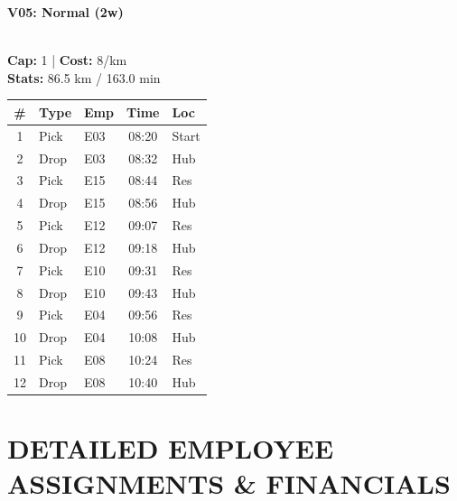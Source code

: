 \documentclass[a4paper,11pt]{article}
\begin{document}
\begin{minipage}[t]{0.32\textwidth}
    \centering
    \colorbox{velorablue}{\parbox{\dimexpr\linewidth-2\fboxsep}{\centering \color{white}\textbf{V05: Normal (2w)}}} \\
    \vspace{0.05cm}
    {\tiny \textbf{Cap:} 1 | \textbf{Cost:} 8/km \\ \textbf{Stats:} 86.5 km / 163.0 min}
    \vspace{0.05cm}
    
    \renewcommand{\arraystretch}{0.85}
    \setlength{\tabcolsep}{1pt}
    \tiny
    \begin{tabular}{c l l c l}
        \toprule
        \textbf{\#} & \textbf{Type} & \textbf{Emp} & \textbf{Time} & \textbf{Loc} \\
        \midrule
        1 & Pick & E03 & 08:20 & Start \\
        \rowcolor{headergray} 2 & Drop & E03 & 08:32 & Hub \\
        3 & Pick & E15 & 08:44 & Res \\
        \rowcolor{headergray} 4 & Drop & E15 & 08:56 & Hub \\
        5 & Pick & E12 & 09:07 & Res \\
        \rowcolor{headergray} 6 & Drop & E12 & 09:18 & Hub \\
        7 & Pick & E10 & 09:31 & Res \\
        \rowcolor{headergray} 8 & Drop & E10 & 09:43 & Hub \\
        9 & Pick & E04 & 09:56 & Res \\
        \rowcolor{headergray} 10 & Drop & E04 & 10:08 & Hub \\
        11 & Pick & E08 & 10:24 & Res \\
        \rowcolor{headergray} 12 & Drop & E08 & 10:40 & Hub \\
        \bottomrule
    \end{tabular}
\end{minipage}

\vspace{0.2cm}

\section*{\textcolor{velorablue}{\uppercase{Detailed Employee Assignments \& Financials}}}
\vspace{-0.3cm}
\end{document}
